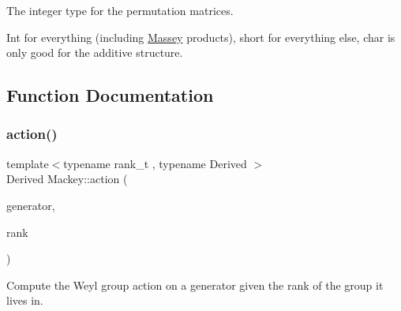 The integer type for the permutation matrices.

Int for everything (including \hyperlink{classMackey_1_1Massey}{Massey} products), short for everything else, char is only good for the additive structure. 

\subsection{Function Documentation}
\mbox{\label{namespaceMackey_aa515b26c0fbc7f19b36cee7d826f07b9}} 
\subsubsection{\texorpdfstring{action()}{action()}\hspace{0.1cm}{\footnotesize\ttfamily [1/2]}}
{\footnotesize\ttfamily template$<$typename rank\+\_\+t , typename Derived $>$ \\
Derived Mackey\+::action (\begin{DoxyParamCaption}\item[{const Eigen\+::\+Matrix\+Base$<$ Derived $>$ \&}]{generator,  }\item[{const rank\+\_\+t \&}]{rank }\end{DoxyParamCaption})}



Compute the Weyl group action on a generator given the rank of the group it lives in. 

